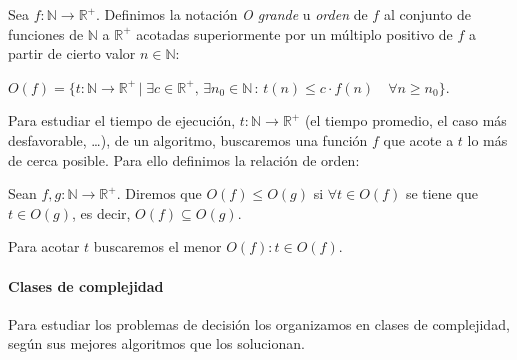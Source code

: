 \begin{definition}
	Sea $f : \mathbb{N} \rightarrow \mathbb{R}^+$. Definimos la notación \textit{O grande} u \textit{orden} de $f$ al conjunto de funciones de $\mathbb{N}$ a $\mathbb{R}^+$ acotadas superiormente por un múltiplo positivo de $f$ a partir de cierto valor $n \in \mathbb{N}$:
		
		$O(f) = \{t:\mathbb{N} \rightarrow \mathbb{R}^+ \, | \; \exists c \in \mathbb{R}^+,\, \exists 
		n_0\in \mathbb{N} \, : \, t(n) \leq c\cdot f(n) \quad \forall n \geq n_0  \}$. 

\end{definition}

\hfil

Para estudiar el tiempo de ejecución, $t : \mathbb{N} \rightarrow \mathbb{R}^+$ (el tiempo promedio, el caso más desfavorable, \dots), de un algoritmo, buscaremos una función $f$ que acote a $t$ lo más de cerca posible. Para ello definimos la relación de orden:

\begin{definition}
	Sean $f, g : \mathbb{N} \rightarrow \mathbb{R}^+$.
	Diremos que  $O(f) \leq O(g)$ si $\forall t \in O(f)$ se tiene que $t \in O(g)$, es decir,  $O(f) \subseteq O(g)$.
\end{definition}

Para acotar $t$ buscaremos el menor $O(f) : t\in O(f)$.


\hfil 

\paragraph{Clases de complejidad}

\hfil

 Para estudiar los problemas de decisión los organizamos en clases de complejidad, según sus mejores algoritmos que los solucionan.


